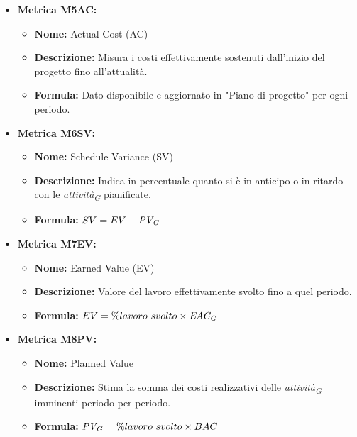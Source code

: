 \begin{itemize}
    \item \textbf{Metrica M5AC:}
          \begin{itemize}
              \item \textbf{Nome:} Actual Cost (AC)
              \item \textbf{Descrizione:} Misura i costi effettivamente sostenuti dall’inizio del progetto fino all’attualità.
              \item \textbf{Formula:} Dato disponibile e aggiornato in "Piano di progetto" per ogni periodo.
          \end{itemize}

    \item \textbf{Metrica M6SV:}
          \begin{itemize}
              \item \textbf{Nome:} Schedule Variance (SV)
              \item \textbf{Descrizione:} Indica in percentuale quanto si è in anticipo o in ritardo con le \textit{attività}\textsubscript{\textit{G}} pianificate.
              \item \textbf{Formula:} $SV = EV - \textit{PV}\textsubscript{\textit{G}}$
          \end{itemize}

    \item \textbf{Metrica M7EV:}
          \begin{itemize}
              \item \textbf{Nome:} Earned Value (EV)
              \item \textbf{Descrizione:} Valore del lavoro effettivamente svolto fino a quel periodo.
              \item \textbf{Formula:} $EV = \% lavoro \ svolto \times \textit{EAC}\textsubscript{\textit{G}}$
          \end{itemize}

    \item \textbf{Metrica M8PV:}
          \begin{itemize}
              \item \textbf{Nome:} Planned Value
              \item \textbf{Descrizione:} Stima la somma dei costi realizzativi delle \textit{attività}\textsubscript{\textit{G}} imminenti periodo per periodo.
              \item \textbf{Formula:} $\textit{PV}\textsubscript{\textit{G}} = \% lavoro \ svolto \times BAC$
          \end{itemize}


\end{itemize}
